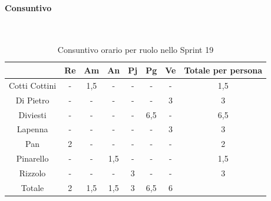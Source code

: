 \documentclass{article}
\begin{document}
            \paragraph{Consuntivo}\mbox{}\\
            \begin{table}[H]
                \centering
                \begin{tabular}{|c|c|c|c|c|c|c|c|}
                \hline
                              & Re  & Am  & An  & Pj  & Pg  & Ve  & Totale per persona \\ \hline
                Cotti Cottini & -   & 1,5 & -   & -   & -   & -   & 1,5                \\ \hline
                Di Pietro     & -   & -   & -   & -   & -   & 3   & 3                  \\ \hline
                Diviesti      & -   & -   & -   & -   & 6,5 & -   & 6,5                \\ \hline
                Lapenna       & -   & -   & -   & -   & -   & 3   & 3                  \\ \hline
                Pan           & 2   & -   & -   & -   & -   & -   & 2                  \\ \hline
                Pinarello     & -   & -   & 1,5 & -   & -   & -   & 1,5                \\ \hline
                Rizzolo       & -   & -   & -   & 3   & -   & -   & 3                  \\ \hline
                Totale        & 2   & 1,5 & 1,5 & 3   & 6,5 & 6   &                    \\ \hline
                \end{tabular}
                \caption{Consuntivo orario per ruolo nello Sprint 19}
            \end{table}

\end{document}
